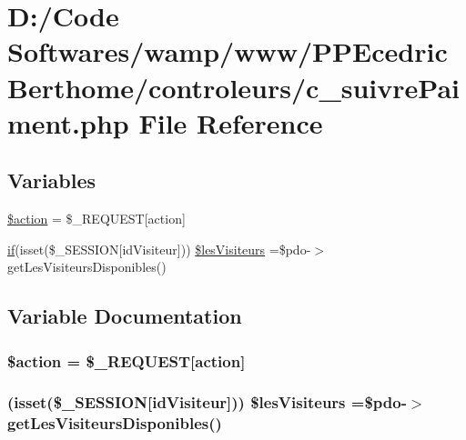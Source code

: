 \hypertarget{c__suivre_paiment_8php}{}\section{D\+:/\+Code Softwares/wamp/www/\+P\+P\+Ecedric\+Berthome/controleurs/c\+\_\+suivre\+Paiment.php File Reference}
\label{c__suivre_paiment_8php}
\subsection*{Variables}
\begin{DoxyCompactItemize}
\item 
\hyperlink{c__suivre_paiment_8php_aa698a3e72116e8e778be0e95d908ee30}{\$action} = \$\+\_\+\+R\+E\+Q\+U\+E\+ST\mbox{[}\textquotesingle{}action\textquotesingle{}\mbox{]}
\item 
\hyperlink{jquery_8js_a42cbfadee2b4749e8f699ea8d745a0e4}{if}(isset(\$\+\_\+\+S\+E\+S\+S\+I\+ON\mbox{[}\textquotesingle{}id\+Visiteur\textquotesingle{}\mbox{]})) \hyperlink{c__suivre_paiment_8php_a48774b5024834e9fe7d56b62e846de65}{\$les\+Visiteurs} =\$pdo-\/$>$get\+Les\+Visiteurs\+Disponibles()
\end{DoxyCompactItemize}


\subsection{Variable Documentation}
\subsubsection[{\texorpdfstring{\$action}{$action}}]{\setlength{\rightskip}{0pt plus 5cm}\$action = \$\+\_\+\+R\+E\+Q\+U\+E\+ST\mbox{[}\textquotesingle{}action\textquotesingle{}\mbox{]}}\hypertarget{c__suivre_paiment_8php_aa698a3e72116e8e778be0e95d908ee30}{}\label{c__suivre_paiment_8php_aa698a3e72116e8e778be0e95d908ee30}
\subsubsection[{\texorpdfstring{\$les\+Visiteurs}{$lesVisiteurs}}]{ (isset(\$\+\_\+\+S\+E\+S\+S\+I\+ON\mbox{[}\textquotesingle{}id\+Visiteur\textquotesingle{}\mbox{]})) \$les\+Visiteurs =\$pdo-\/$>$get\+Les\+Visiteurs\+Disponibles()}\hypertarget{c__suivre_paiment_8php_a48774b5024834e9fe7d56b62e846de65}{}\label{c__suivre_paiment_8php_a48774b5024834e9fe7d56b62e846de65}

